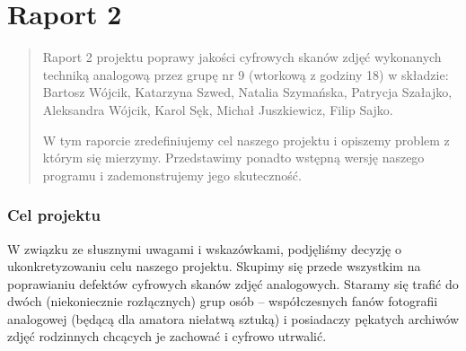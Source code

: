 \documentclass[]{mwart}
\begin{document}
\vfill
\newpage
\part{Raport 2}


\vfill
\begin{abstract}
    Raport 2 projektu poprawy jakości cyfrowych skanów zdjęć wykonanych techniką analogową przez grupę nr 9 (wtorkową z godziny 18)
    w składzie:  Bartosz Wójcik, Katarzyna Szwed, Natalia Szymańska,
    Patrycja Szałajko, Aleksandra Wójcik, Karol Sęk, Michał Juszkiewicz, Filip Sajko.

    W tym raporcie zredefiniujemy cel naszego projektu i opiszemy problem z którym się mierzymy.
    Przedstawimy ponadto wstępną wersję naszego programu i zademonstrujemy jego skuteczność.
\end{abstract}







\newpage

\section{Cel projektu}
W związku ze słusznymi uwagami i wskazówkami, podjęliśmy decyzję o ukonkretyzowaniu celu naszego projektu.
Skupimy się przede wszystkim na poprawianiu defektów cyfrowych skanów zdjęć analogowych.
Staramy się trafić do dwóch (niekoniecznie rozłącznych) grup osób --
współczesnych fanów fotografii analogowej (będącą dla amatora niełatwą sztuką) i posiadaczy pękatych
archiwów zdjęć rodzinnych chcących je zachować i cyfrowo utrwalić.
\end{document}
